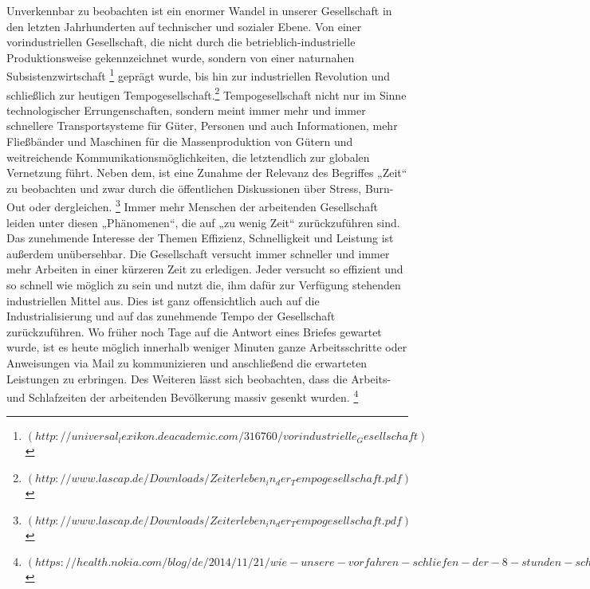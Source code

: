 \documentclass{Paper}
\begin{document}
 Unverkennbar zu beobachten ist ein enormer Wandel in unserer Gesellschaft in den letzten Jahrhunderten auf technischer und sozialer Ebene. Von einer vorindustriellen Gesellschaft, die nicht durch die betrieblich-industrielle Produktionsweise gekennzeichnet wurde, sondern von einer naturnahen Subsistenzwirtschaft \footnote{$(http://universal_lexikon.deacademic.com/316760/vorindustrielle_Gesellschaft)$} geprägt wurde, bis hin zur industriellen Revolution und schließlich zur heutigen Tempogesellschaft.\footnote{$(http://www.lascap.de/Downloads/Zeiterleben_in_der_Tempogesellschaft.pdf)$} Tempogesellschaft nicht nur im Sinne technologischer Errungenschaften, sondern meint immer mehr und immer schnellere Transportsysteme für Güter, Personen und auch Informationen, mehr Fließbänder und Maschinen für die Massenproduktion von Gütern und weitreichende Kommunikationsmöglichkeiten, die letztendlich zur globalen Vernetzung führt. Neben dem, ist eine Zunahme der Relevanz des Begriffes „Zeit“ zu beobachten und zwar durch die öffentlichen Diskussionen über Stress, Burn-Out oder dergleichen. \footnote{$(http://www.lascap.de/Downloads/Zeiterleben_in_der_Tempogesellschaft.pdf)$} Immer mehr Menschen der arbeitenden Gesellschaft leiden unter diesen „Phänomenen“, die auf „zu wenig Zeit“  zurückzuführen sind. Das zunehmende Interesse der Themen Effizienz, Schnelligkeit und Leistung ist außerdem unübersehbar. Die Gesellschaft versucht immer schneller und immer mehr Arbeiten in einer kürzeren Zeit zu erledigen. Jeder versucht so effizient und so schnell wie möglich zu sein und nutzt die, ihm dafür zur Verfügung stehenden industriellen Mittel aus. Dies ist ganz offensichtlich auch auf die Industrialisierung und auf das zunehmende Tempo der Gesellschaft zurückzuführen. Wo früher noch Tage auf die Antwort eines Briefes gewartet wurde, ist es heute möglich innerhalb weniger Minuten ganze Arbeitsschritte oder Anweisungen via Mail zu kommunizieren und anschließend die erwarteten Leistungen zu erbringen. 
Des Weiteren lässt sich beobachten, dass die Arbeits-und Schlafzeiten der arbeitenden Bevölkerung massiv gesenkt wurden. \footnote{$(https://health.nokia.com/blog/de/2014/11/21/wie-unsere-vorfahren-schliefen-der-8-stunden-schlaf-ist-ein-phaenomen-der-moderne/ ; http://www.schultreff.de/referate/geschichte/r0045t00.htm )$}
\\
\end{document}

